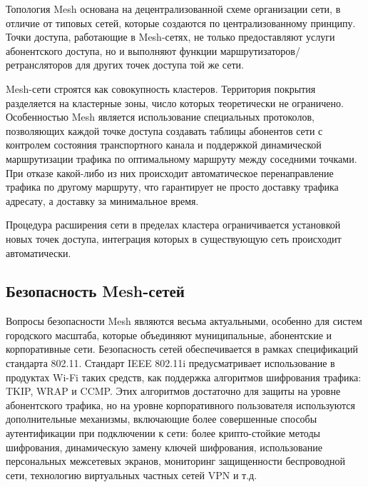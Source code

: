 \documentclass[a4paper]{article}
\begin{document}
Топология Mesh основана на децентрализованной схеме организации сети, в отличие от типовых сетей, которые создаются по централизованному принципу.
 Точки доступа, работающие в Mesh-сетях, не только предоставляют услуги абонентского доступа, но и выполняют функции маршрутизаторов/ретрансляторов для других точек доступа той же сети. 

Mesh-сети строятся как совокупность кластеров. Территория покрытия разделяется на кластерные зоны, число которых теоретически не ограничено. 
Особенностью Mesh является использование специальных протоколов, позволяющих каждой точке доступа создавать таблицы абонентов сети с контролем состояния транспортного канала и поддержкой динамической маршрутизации трафика по оптимальному маршруту между соседними точками. 
При отказе какой-либо из них происходит автоматическое перенаправление трафика по другому маршруту, что гарантирует не просто доставку трафика адресату, а доставку за минимальное время.

Процедура расширения сети в пределах кластера ограничивается установкой новых точек доступа, интеграция которых в существующую сеть происходит автоматически.

\subsection{Безопасность Mesh-сетей}

Вопросы безопасности Mesh  являются весьма актуальными, особенно для систем городского масштаба, которые объединяют муниципальные, абонентские и корпоративные сети. 
Безопасность сетей обеспечивается в рамках спецификаций стандарта 802.11. Стандарт IEEE 802.11i предусматривает использование в продуктах Wi-Fi таких средств, как поддержка алгоритмов шифрования трафика: TKIP, WRAP и CCMP.
 Этих алгоритмов достаточно для защиты на уровне абонентского трафика, но на уровне корпоративного пользователя используются дополнительные механизмы, включающие более совершенные способы аутентификации при подключении к сети: более крипто-стойкие методы шифрования, динамическую замену ключей шифрования, использование персональных межсетевых экранов, мониторинг защищенности беспроводной сети, технологию виртуальных частных сетей VPN и т.д.
\end{document}
